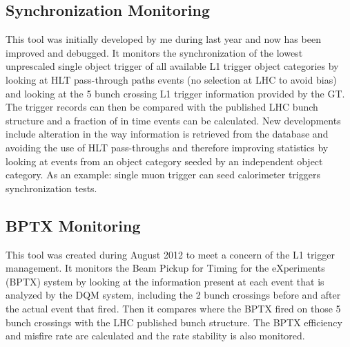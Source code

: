 \subsection{Synchronization Monitoring}

This tool was initially developed by me during last year and now has been improved and debugged. It monitors
the synchronization of the lowest unprescaled single object trigger of all available L1 trigger object categories
by looking at HLT pass-through paths events (no selection at LHC to avoid bias) and looking at the 5 bunch crossing
L1 trigger information provided by the GT. The trigger records can then be compared with the published LHC bunch
structure and a fraction of in time events can be calculated. New developments include alteration in the way
information is retrieved from the database and avoiding the use of HLT pass-throughs and therefore improving statistics
by looking at events from an object category seeded by an independent object category. As an example: single muon
trigger can seed calorimeter triggers synchronization tests.


\subsection{BPTX Monitoring}

This tool was created during August 2012 to meet a concern of the L1 trigger management. It monitors the Beam
Pickup for Timing for the eXperiments (BPTX) system by looking at the information present at each event that 
is analyzed by the DQM system, including the 2 bunch crossings before and after the actual event that fired. Then it 
compares where the BPTX fired on those 5 bunch crossings with the LHC published bunch structure. The BPTX efficiency 
and misfire rate are calculated and the rate stability is also monitored.


